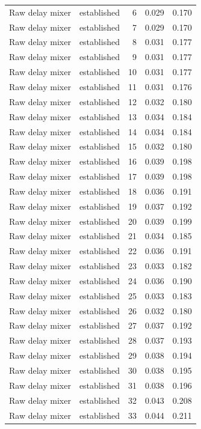 \begin{tabular}{llrrr}
Raw delay mixer & established & 6 & 0.029 & 0.170 \\
Raw delay mixer & established & 7 & 0.029 & 0.170 \\
Raw delay mixer & established & 8 & 0.031 & 0.177 \\
Raw delay mixer & established & 9 & 0.031 & 0.177 \\
Raw delay mixer & established & 10 & 0.031 & 0.177 \\
Raw delay mixer & established & 11 & 0.031 & 0.176 \\
Raw delay mixer & established & 12 & 0.032 & 0.180 \\
Raw delay mixer & established & 13 & 0.034 & 0.184 \\
Raw delay mixer & established & 14 & 0.034 & 0.184 \\
Raw delay mixer & established & 15 & 0.032 & 0.180 \\
Raw delay mixer & established & 16 & 0.039 & 0.198 \\
Raw delay mixer & established & 17 & 0.039 & 0.198 \\
Raw delay mixer & established & 18 & 0.036 & 0.191 \\
Raw delay mixer & established & 19 & 0.037 & 0.192 \\
Raw delay mixer & established & 20 & 0.039 & 0.199 \\
Raw delay mixer & established & 21 & 0.034 & 0.185 \\
Raw delay mixer & established & 22 & 0.036 & 0.191 \\
Raw delay mixer & established & 23 & 0.033 & 0.182 \\
Raw delay mixer & established & 24 & 0.036 & 0.190 \\
Raw delay mixer & established & 25 & 0.033 & 0.183 \\
Raw delay mixer & established & 26 & 0.032 & 0.180 \\
Raw delay mixer & established & 27 & 0.037 & 0.192 \\
Raw delay mixer & established & 28 & 0.037 & 0.193 \\
Raw delay mixer & established & 29 & 0.038 & 0.194 \\
Raw delay mixer & established & 30 & 0.038 & 0.195 \\
Raw delay mixer & established & 31 & 0.038 & 0.196 \\
Raw delay mixer & established & 32 & 0.043 & 0.208 \\
Raw delay mixer & established & 33 & 0.044 & 0.211 \\

\end{tabular}
